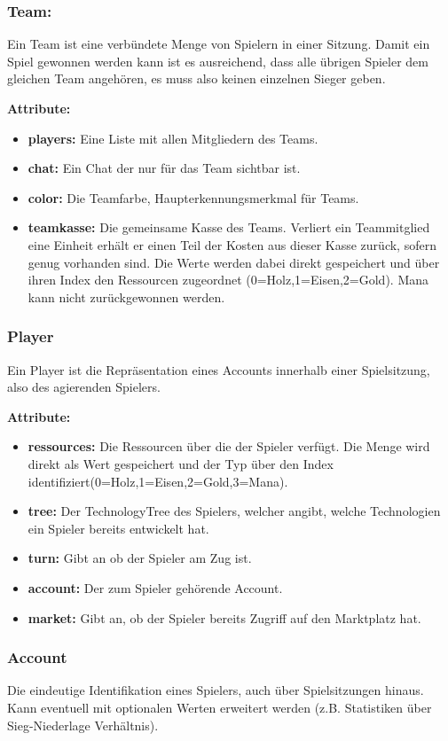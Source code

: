 \documentclass[fontsize=12pt,paper=a4,twoside]{scrartcl}
\begin{document}
\subsubsection{Team:}

Ein Team ist eine verbündete Menge von Spielern in einer Sitzung. Damit ein Spiel gewonnen werden kann ist es ausreichend, dass alle übrigen Spieler dem gleichen Team angehören, es muss also keinen einzelnen Sieger geben.

\textbf{Attribute:}
\begin{itemize}
\item \textbf{players:} Eine Liste mit allen Mitgliedern des Teams.
\item \textbf{chat:} Ein Chat der nur für das Team sichtbar ist.
\item \textbf{color:} Die Teamfarbe, Haupterkennungsmerkmal für Teams.
\item \textbf{teamkasse:} Die gemeinsame Kasse des Teams. Verliert ein Teammitglied eine Einheit erhält er einen Teil der Kosten aus dieser Kasse zurück, sofern genug vorhanden sind. Die Werte werden dabei direkt gespeichert und über ihren Index den Ressourcen zugeordnet (0=Holz,1=Eisen,2=Gold). Mana kann nicht zurückgewonnen werden.
\end{itemize}

\subsubsection{Player}
Ein Player ist die Repräsentation eines Accounts innerhalb einer Spielsitzung, also des agierenden Spielers.

\textbf{Attribute:}
\begin{itemize}
\item \textbf{ressources:} Die Ressourcen über die der Spieler verfügt. Die Menge wird direkt als Wert gespeichert und der Typ über den Index identifiziert(0=Holz,1=Eisen,2=Gold,3=Mana).
\item \textbf{tree:} Der TechnologyTree des Spielers, welcher angibt, welche Technologien ein Spieler bereits entwickelt hat.
\item \textbf{turn:} Gibt an ob der Spieler am Zug ist.
\item \textbf{account:} Der zum Spieler gehörende Account.
\item \textbf{market:} Gibt an, ob der Spieler bereits Zugriff auf den Marktplatz hat.
\end{itemize}

\subsubsection{Account}
Die eindeutige Identifikation eines Spielers, auch über Spielsitzungen hinaus. Kann eventuell mit optionalen Werten erweitert werden (z.B. Statistiken über Sieg-Niederlage Verhältnis).
\end{document}
